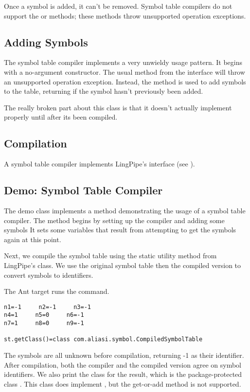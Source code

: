 Once a symbol is added, it can't be removed.  Symbol table
compilers do not support the  or 
methods; these methods throw unsupported operation exceptions.

\subsection{Adding Symbols}

The symbol table compiler implements a very unwieldy usage pattern.
It begins with a no-argument constructor.  The usual
 method from the 
interface will throw an unsupported operation exception.  Instead, the
method  is used to add symbols to the table,
returning  if the symbol hasn't previously been added.

The really broken part about this class is that it doesn't actually
implement  properly until after its been compiled.

\subsection{Compilation}

A symbol table compiler implements LingPipe's 
interface (see ).  

\subsection{Demo: Symbol Table Compiler}

The demo class  implements a 
method demonstrating the usage of a symbol table compiler.  The method
begins by setting up the compiler and adding some symbols
%
%
It sets some variables that result from attempting to get the symbols
again at this point.

Next, we compile the symbol table using the static utility method
 from LingPipe's  class.
We use the original symbol table then the compiled version to convert
symbols to identifiers.

The Ant target  runs the command.
%
\begin{verbatim}
n1=-1     n2=-1     n3=-1
n4=1     n5=0     n6=-1
n7=1     n8=0     n9=-1

st.getClass()=class com.aliasi.symbol.CompiledSymbolTable
\end{verbatim}
%
The symbols are all unknown before compilation, returning -1 as their
identifier.  After compilation, both the compiler and the compiled
version agree on symbol identifiers.  We also print the class for the
result, which is the package-protected class
.  This class does implement
, but the get-or-add method is not supported.

